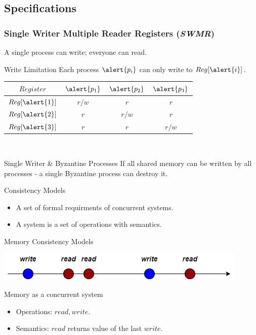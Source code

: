 \subsection{Specifications}
\begin{frame}
    \frametitle{Single Writer Multiple Reader Registers (\emph{SWMR})}
    A single process can write; everyone can read.\\
    \begin{block}{Write Limitation}
    Each process $\alert{p_i}$  can only write to $Reg[\alert{i}]$.
        \begin{center}
            \begin{tabular}{|c|c c c|}
                \hline
                $Register$ & $\alert{p_1}$ & $\alert{p_2}$ & $\alert{p_3}$ \\
                \hline
                $Reg[\alert{1}]$ & \alert{$r/w$} & $r$ & $r$ \\ 
                \hline
                $Reg[\alert{2}]$ & $r$ & \alert{$r/w$} & $r$ \\  
                \hline
                $Reg[\alert{3}]$ & $r$ & $r$ & \alert{$r/w$}\\
                \hline
            \end{tabular}\\
        \end{center}
    \end{block}
    \pause
    \begin{block}{Single Writer \& Byzantine Processes}
        If all shared memory can be written by all processes - a single Byzantine process can destroy it.
    \end{block}
\end{frame}
\begin{frame}{Consistency Models}
    \begin{itemize}
        \item A set of formal requirments of concurrent systems.
        \pause
        \item A system is a set of \alert{operations} with \alert{semantics}.
    \end{itemize}
\end{frame}
\begin{frame}{Memory Consistency Models}
    \begin{center}
        \includegraphics[scale=.5]{resources/memory_model_naive.png}
    \end{center}
    \begin{block}{Memory as a concurrent system}
        \begin{itemize}
            \item \alert{Operations}: $read, write$.
            \pause
            \item \alert{Semantics}: $read$ returns value of the last $write$.
        \end{itemize}    
    \end{block}
\end{frame}

